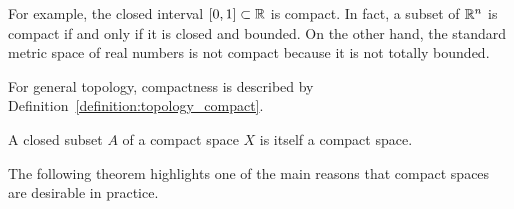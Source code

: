 For example, the closed interval $[0,1]\subset \mathbb{R}$ is compact.
In fact, a subset of $\mathbb{R}^n$ is compact if and only if it is closed and bounded.
On the other hand, the standard metric space of real numbers is not compact because it is not totally bounded.

\begin{remark}
For general topology, compactness is described by Definition~\ref{definition:topology_compact}.
\end{remark}

\begin{theorem}
\label{thm:CompactClosedSubsetCompact}
A closed subset $A$ of a compact space $X$ is itself a compact space.
\end{theorem}

The following theorem highlights one of the main reasons that compact spaces are desirable in practice.

